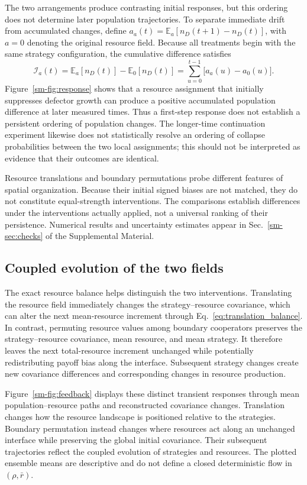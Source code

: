 The two arrangements produce contrasting initial responses, but this ordering does not determine later population trajectories. To separate immediate drift from accumulated changes, define $a_a(t)=\mathbb E_a[n_D(t+1)-n_D(t)]$, with $a=0$ denoting the original resource field. Because all treatments begin with the same strategy configuration, the cumulative difference satisfies
\begin{equation}
\label{eq:cumulative_response}
\mathcal I_a(t)=
\mathbb E_a[n_D(t)]-\mathbb E_0[n_D(t)]
=\sum_{u=0}^{t-1}\bigl[a_a(u)-a_0(u)\bigr].
\end{equation}
Figure~\ref{sm-fig:response} shows that a resource assignment that initially suppresses defector growth can produce a positive accumulated population difference at later measured times. Thus a first-step response does not establish a persistent ordering of population changes. The longer-time continuation experiment likewise does not statistically resolve an ordering of collapse probabilities between the two local assignments; this should not be interpreted as evidence that their outcomes are identical.

Resource translations and boundary permutations probe different features of spatial organization. Because their initial signed biases are not matched, they do not constitute equal-strength interventions. The comparisons establish differences under the interventions actually applied, not a universal ranking of their persistence. Numerical results and uncertainty estimates appear in Sec.~\ref{sm-sec:checks} of the Supplemental Material.

\subsection{Coupled evolution of the two fields}

The exact resource balance helps distinguish the two interventions. Translating the resource field immediately changes the strategy--resource covariance, which can alter the next mean-resource increment through Eq.~\eqref{eq:translation_balance}. In contrast, permuting resource values among boundary cooperators preserves the strategy--resource covariance, mean resource, and mean strategy. It therefore leaves the next total-resource increment unchanged while potentially redistributing payoff bias along the interface. Subsequent strategy changes create new covariance differences and corresponding changes in resource production.

Figure~\ref{sm-fig:feedback} displays these distinct transient responses through mean population--resource paths and reconstructed covariance changes. Translation changes how the resource landscape is positioned relative to the strategies. Boundary permutation instead changes where resources act along an unchanged interface while preserving the global initial covariance. Their subsequent trajectories reflect the coupled evolution of strategies and resources. The plotted ensemble means are descriptive and do not define a closed deterministic flow in $(\rho,\bar r)$.

